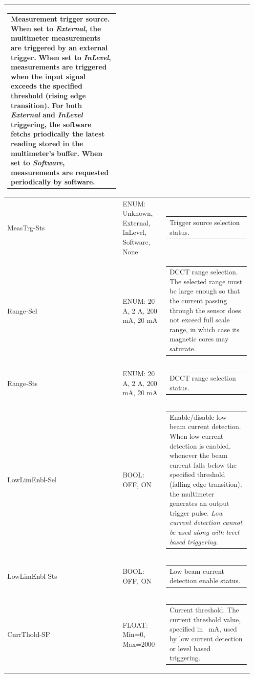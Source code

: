 \documentclass[openany]{article}
\begin{document}
\begin{longtable}{| m{3.0cm} m{4.5cm} m{7.0cm} |}
\begin{tabular}{@{}m{6cm}@{}}
				      	  Measurement trigger source. When set to \emph{External}, the multimeter measurements are triggered by an external trigger. When set to \emph{InLevel}, measurements are triggered when the input signal exceeds the specified threshold (rising edge transition). For both \emph{External} and \emph{InLevel} triggering, the software fetchs priodically the latest reading stored in the multimeter's buffer. When set to \emph{Software}, measurements are requested periodically by software.
					  \end{tabular} \\ \hline
		MeasTrg-Sts & ENUM: Unknown, External, InLevel, Software, None & \begin{tabular}{@{}m{6cm}@{}}
	    					Trigger source selection status.
						\end{tabular} \\ \hline
		Range-Sel & ENUM: 20 A, 2 A, 200 mA, 20 mA & \begin{tabular}{@{}m{6cm}@{}}
	    					DCCT range selection. The selected range must be large enough so that the current passing through the sensor does not exceed full scale range, in which case its magnetic cores may saturate.
						\end{tabular} \\ \hline
		Range-Sts & ENUM: 20 A, 2 A, 200 mA, 20 mA & \begin{tabular}{@{}m{6cm}@{}}
	    					DCCT range selection status.
						\end{tabular} \\ \hline
		LowLimEnbl-Sel & BOOL: OFF, ON & \begin{tabular}{@{}m{6cm}@{}}
	    					Enable/disable low beam current detection. When low current detection is enabled, whenever the beam current falls below the specified threshold (falling edge transition), the multimeter generates an output trigger pulse. \emph{Low current detection cannot be used along with level based triggering}.
						\end{tabular} \\ \hline
		LowLimEnbl-Sts & BOOL: OFF, ON & \begin{tabular}{@{}m{6cm}@{}}
	    					Low beam current detection enable status.
						\end{tabular} \\ \hline
		CurrThold-SP & FLOAT: Min=0, Max=2000 & \begin{tabular}{@{}m{6cm}@{}}
	    					Current threshold. The current threshold value, specified in \SI{}{\milli\ampere}, used by low current detection or level based triggering.

\end{tabular}
\end{longtable}
\end{document}
